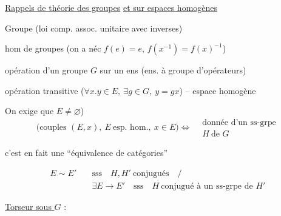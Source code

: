 \uline{Rappels de théorie des groupes} \uline{et sur espaces homogènes}

Groupe (loi comp. assoc. unitaire avec inverses)

hom de groupes (on a néc $f(e)=e$, $f(x^{-1})=f(x)^{-1}$)

opération d'un groupe $G$ sur un ens (ens. à groupe d'opérateurs)

opération transitive ($\forall x\mathord{.}y\in E,\ \exists g\in G,\ y=gx$) -- espace homogène

On exige  que $E\ne\varnothing$)
\[
\bigl(\text{couples }(E,x),\ E\ \text{esp. hom.},\ x\in E\bigr)
\Longleftrightarrow
\begin{aligned}&\text{donnée d'un ss-grpe}\\&H\ \text{de }G\end{aligned}
\]

c'est en fait une ``équivalence de catégories''

{\small
{}}
{\small
\[
\begin{aligned}
E\sim E' \quad &\text{sss}\quad H,H'\ \text{conjugués}\quad \big/\\[-2pt]
&\exists E\to E'\quad\text{sss}\quad H\ \text{conjugué à un ss-grpe de }H'
\end{aligned}
\]}

\uline{Torseur sous $G$} :
{\small
{}}

